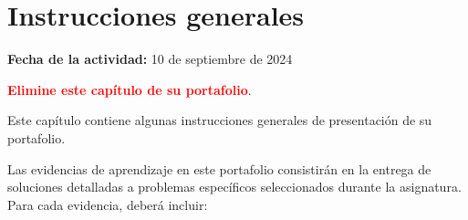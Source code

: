 \documentclass[../portafolio.tex]{subfiles}
\begin{document}
\chapter{Instrucciones generales}
\label{ch:instrucciones}

\hfill \textbf{Fecha de la actividad:} 10 de septiembre de 2024

\medskip

\textcolor{red}{\bf Elimine este capítulo de su portafolio}.

\medskip

Este capítulo contiene algunas instrucciones generales de presentación
de su portafolio.

Las evidencias de aprendizaje en este portafolio consistirán en la
entrega de soluciones detalladas a problemas específicos seleccionados
durante la asignatura. Para cada evidencia, deberá incluir:
\end{document}
